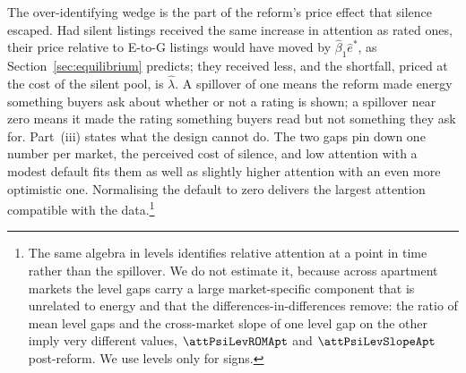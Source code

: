 The over-identifying wedge is the part of the reform's price effect that silence escaped. Had silent listings received the same increase in attention as rated ones, their price relative to E-to-G listings would have moved by $\hat\beta_1\hat e^*$, as Section~\ref{sec:equilibrium} predicts; they received less, and the shortfall, priced at the cost of the silent pool, is $\hat\lambda$. A spillover of one means the reform made energy something buyers ask about whether or not a rating is shown; a spillover near zero means it made the rating something buyers read but not something they ask for. Part~(iii) states what the design cannot do. The two gaps pin down one number per market, the perceived cost of silence, and low attention with a modest default fits them as well as slightly higher attention with an even more optimistic one. Normalising the default to zero delivers the largest attention compatible with the data.\footnote{The same algebra in levels identifies relative attention at a point in time rather than the spillover. We do not estimate it, because across apartment markets the level gaps carry a large market-specific component that is unrelated to energy and that the differences-in-differences remove: the ratio of mean level gaps and the cross-market slope of one level gap on the other imply very different values, $\attPsiLevROMApt$ and $\attPsiLevSlopeApt$ post-reform. We use levels only for signs.}
